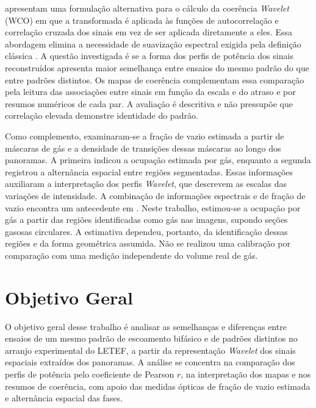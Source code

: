  apresentam uma formulação alternativa para o cálculo da
coerência \textit{Wavelet} (WCO) em
que a transformada é aplicada às funções de autocorrelação e correlação cruzada dos sinais
em vez de ser aplicada diretamente a eles. Essa abordagem elimina a necessidade de
suavização espectral exigida pela definição clássica \cite{torrence1998,grinsted2004}. A questão
investigada é se a forma dos perfis de potência dos sinais reconstruídos apresenta
maior semelhança entre ensaios do mesmo padrão do que entre padrões distintos.
Os mapas de coerência complementam essa comparação pela leitura das associações
entre sinais em função da escala e do atraso e por resumos numéricos de cada par.
A avaliação é descritiva e não pressupõe que
correlação elevada demonstre identidade do padrão.

Como complemento, examinaram-se a fração de vazio estimada a partir de máscaras de
gás e a densidade de transições dessas máscaras ao longo dos panoramas. A primeira
indicou a ocupação estimada por gás, enquanto a segunda registrou a alternância espacial
entre regiões segmentadas. Essas informações auxiliaram a interpretação dos perfis
\textit{Wavelet}, que descrevem as escalas das variações de intensidade. A combinação de
informações espectrais e de fração de vazio encontra um antecedente em
. Neste trabalho, estimou-se a ocupação por gás a partir
das regiões identificadas como gás nas imagens, supondo seções gasosas circulares.
A estimativa dependeu, portanto, da identificação dessas regiões e da forma
geométrica assumida. Não se realizou uma calibração por comparação com uma
medição independente do volume real de gás.

\section{Objetivo Geral}

O objetivo geral desse trabalho é analisar as semelhanças e diferenças entre
ensaios de um mesmo padrão de escoamento bifásico e de padrões distintos no
arranjo experimental do LETEF, a partir da representação \textit{Wavelet} dos
sinais espaciais extraídos dos panoramas. A análise se concentra na comparação
dos perfis de potência pelo coeficiente de Pearson $r$, na interpretação dos
mapas e nos resumos de coerência, com apoio das medidas ópticas de fração de vazio
estimada e alternância espacial das fases.

